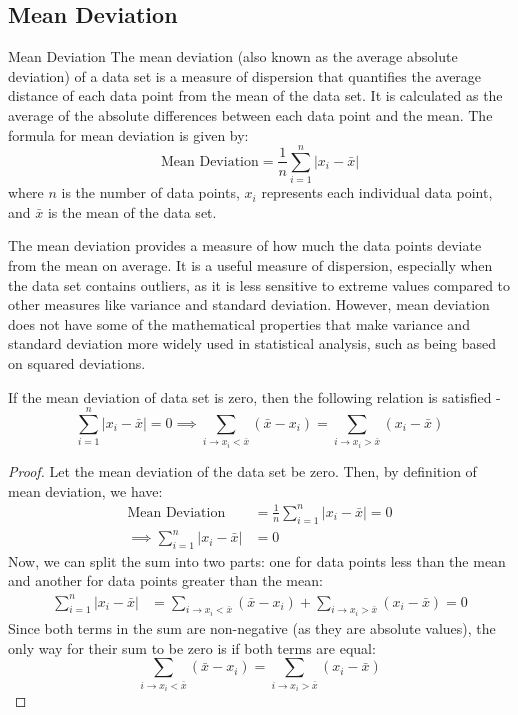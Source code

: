 \documentclass[openany]{book}
\begin{document}
\subsection{Mean Deviation}
\begin{mydefinition}{Mean Deviation}
    The mean deviation (also known as the average absolute deviation) of a data set is a measure of dispersion that quantifies the average distance of each data point from the mean of the data set. It is calculated as the average of the absolute differences between each data point and the mean. The formula for mean deviation is given by:
    $$\text{Mean Deviation} = \frac{1}{n} \sum_{i=1}^{n} |x_i - \bar{x}|$$
    where $n$ is the number of data points, $x_i$ represents each individual data point, and $\bar{x}$ is the mean of the data set.
\end{mydefinition}
\begin{mynote}
    The mean deviation provides a measure of how much the data points deviate from the mean on average. It is a useful measure of dispersion, especially when the data set contains outliers, as it is less sensitive to extreme values compared to other measures like variance and standard deviation. However, mean deviation does not have some of the mathematical properties that make variance and standard deviation more widely used in statistical analysis, such as being based on squared deviations.
\end{mynote}
\begin{mytheorem}
    If the mean deviation of data set is zero, then the following relation is satisfied -
    $$\sum_{i=1}^{n} |x_i - \bar{x}| = 0 \implies \sum_{i \to x_i < \bar{x}} (\bar{x} - x_i) = \sum_{i \to x_i > \bar{x}} (x_i - \bar{x})$$
\end{mytheorem}
\begin{proof}
    Let the mean deviation of the data set be zero. Then, by definition of mean deviation, we have:
    \begin{align*}
        \text{Mean Deviation} &= \frac{1}{n} \sum_{i=1}^{n} |x_i - \bar{x}| = 0 \\
        \implies \sum_{i=1}^{n} |x_i - \bar{x}| &= 0
    \end{align*}
    Now, we can split the sum into two parts: one for data points less than the mean and another for data points greater than the mean:
    \begin{align*}
        \sum_{i=1}^{n} |x_i - \bar{x}| &= \sum_{i \to x_i < \bar{x}} (\bar{x} - x_i) + \sum_{i \to x_i > \bar{x}} (x_i - \bar{x}) = 0
    \end{align*}
    Since both terms in the sum are non-negative (as they are absolute values), the only way for their sum to be zero is if both terms are equal:
    $$\sum_{i \to x_i < \bar{x}} (\bar{x} - x_i) = \sum_{i \to x_i > \bar{x}} (x_i - \bar{x})$$
\end{proof}
\end{document}
